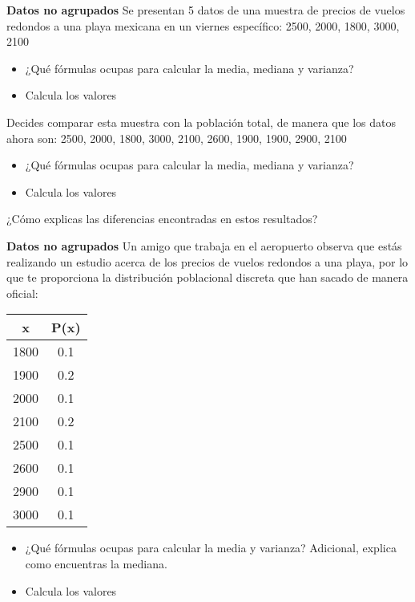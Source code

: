 \documentclass{oxmathproblems}
\begin{document}
\begin{questions}

\miquestion \textbf{Datos no agrupados} Se presentan 5 datos de una muestra de precios de vuelos redondos a una playa mexicana en un viernes específico: 2500, 2000, 1800, 3000, 2100

\begin{itemize}
\item ¿Qué fórmulas ocupas para calcular la media, mediana y varianza?
\item Calcula los valores
\end{itemize}

Decides comparar esta muestra con la población total, de manera que los datos ahora son: 2500, 2000, 1800, 3000, 2100, 2600, 1900, 1900, 2900, 2100

\begin{itemize}
\item ¿Qué fórmulas ocupas para calcular la media, mediana y varianza?
\item Calcula los valores
\end{itemize}

¿Cómo explicas las diferencias encontradas en estos resultados?

\miquestion \textbf{Datos no agrupados} Un amigo que trabaja en el aeropuerto observa que estás realizando un estudio acerca de los precios de vuelos redondos a una playa, por lo que te proporciona la distribución poblacional discreta que han sacado de manera oficial:

\begin{center}
\begin{tabular}{ |c|c| } 
 \hline
 \textbf{x} & \textbf{P(x)} \\ 
 \hline
 1800 & 0.1 \\
 1900 & 0.2 \\
 2000 & 0.1 \\ 
 2100 & 0.2 \\ 
 2500 & 0.1 \\ 
 2600 & 0.1 \\ 
 2900 & 0.1 \\ 
 3000 & 0.1 \\ 
 \hline
\end{tabular}
\end{center}

\begin{itemize}
\item ¿Qué fórmulas ocupas para calcular la media y varianza? Adicional, explica como encuentras la mediana.
\item Calcula los valores
\end{itemize}


\end{questions}
\end{document}
